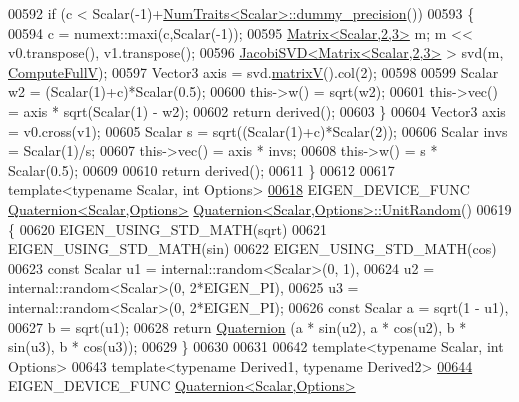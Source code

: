 \begin{DoxyCode}
{00592   \textcolor{keywordflow}{if} (c < Scalar(-1)+\hyperlink{group___core___module_struct_eigen_1_1_num_traits}{NumTraits<Scalar>::dummy\_precision}())
00593   \{
00594     c = numext::maxi(c,Scalar(-1));
00595     \hyperlink{group___core___module_class_eigen_1_1_matrix}{Matrix<Scalar,2,3>} m; m << v0.transpose(), v1.transpose();
00596     \hyperlink{group___s_v_d___module_class_eigen_1_1_jacobi_s_v_d}{JacobiSVD<Matrix<Scalar,2,3>} > svd(m, 
      \hyperlink{group__enums_ggae3e239fb70022eb8747994cf5d68b4a9a52c6f7e80bbf9a42297c88f700245b51}{ComputeFullV});
00597     Vector3 axis = svd.\hyperlink{group___s_v_d___module_a245a453b5e7347f737295c23133238c4}{matrixV}().col(2);
00598 
00599     Scalar w2 = (Scalar(1)+c)*Scalar(0.5);
00600     this->w() = sqrt(w2);
00601     this->vec() = axis * sqrt(Scalar(1) - w2);
00602     \textcolor{keywordflow}{return} derived();
00603   \}
00604   Vector3 axis = v0.cross(v1);
00605   Scalar s = sqrt((Scalar(1)+c)*Scalar(2));
00606   Scalar invs = Scalar(1)/s;
00607   this->vec() = axis * invs;
00608   this->w() = s * Scalar(0.5);
00609 
00610   \textcolor{keywordflow}{return} derived();
00611 \}
00612 
00617 \textcolor{keyword}{template}<\textcolor{keyword}{typename} Scalar, \textcolor{keywordtype}{int} Options>
\hyperlink{group___geometry___module_a8a61f4092bc520c7291e5b5e16e80d71}{00618} EIGEN\_DEVICE\_FUNC \hyperlink{group___geometry___module_class_eigen_1_1_quaternion}{Quaternion<Scalar,Options>} 
      \hyperlink{group___geometry___module_a8a61f4092bc520c7291e5b5e16e80d71}{Quaternion<Scalar,Options>::UnitRandom}()
00619 \{
00620   EIGEN\_USING\_STD\_MATH(sqrt)
00621   EIGEN\_USING\_STD\_MATH(sin)
00622   EIGEN\_USING\_STD\_MATH(cos)
00623   \textcolor{keyword}{const} Scalar u1 = internal::random<Scalar>(0, 1),
00624                u2 = internal::random<Scalar>(0, 2*EIGEN\_PI),
00625                u3 = internal::random<Scalar>(0, 2*EIGEN\_PI);
00626   \textcolor{keyword}{const} Scalar a = sqrt(1 - u1),
00627                b = sqrt(u1);
00628   \textcolor{keywordflow}{return} \hyperlink{group___geometry___module_class_eigen_1_1_quaternion}{Quaternion} (a * sin(u2), a * cos(u2), b * sin(u3), b * cos(u3));
00629 \}
00630 
00631 
00642 \textcolor{keyword}{template}<\textcolor{keyword}{typename} Scalar, \textcolor{keywordtype}{int} Options>
00643 \textcolor{keyword}{template}<\textcolor{keyword}{typename} Derived1, \textcolor{keyword}{typename} Derived2>
\hyperlink{group___geometry___module_a44fa061cd2d1f81419902ad756846a95}{00644} EIGEN\_DEVICE\_FUNC \hyperlink{group___geometry___module_class_eigen_1_1_quaternion}{Quaternion<Scalar,Options>} 
}
\end{DoxyCode}
